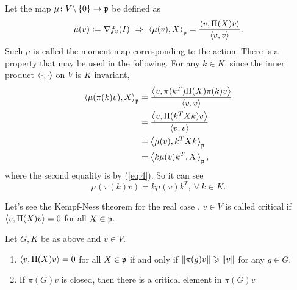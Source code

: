 \documentclass[suri,pdfbookmark]{engsuribt} %
\begin{document}
  Let the map $\mu \colon V\backslash \left\{0\right\} \rightarrow \mathfrak{p}$ be defined as
  \begin{equation*}
    \mu(v) \vcentcolon= \nabla f_v(I) ~\Rightarrow~ \left\langle \mu(v),X \right\rangle_{\mathfrak{p}} = \frac{\left\langle v,\Pi(X)v \right\rangle}{\left\langle v,v \right\rangle}.
  \end{equation*}
  Such $\mu$ is called the moment map corresponding to the action. There is a property that may be used in the following. For any $k \in K$, since the inner product $\left\langle \cdot,\cdot \right\rangle$ on $V$ is $K$-invariant,
  \begin{equation*}
    \begin{split}
      \left\langle \mu(\pi(k)v),X \right\rangle_{\mathfrak{p}} &= \frac{\left\langle v,\pi(k^T)\Pi(X)\pi(k)v \right\rangle}{\left\langle v,v \right\rangle} \\
      &= \frac{\left\langle v,\Pi(k^TXk)v \right\rangle}{\left\langle v,v \right\rangle} \\
      &= \left\langle \mu(v),k^TXk \right\rangle_{\mathfrak{p}} \\
      &= \left\langle k\mu(v)k^T,X \right\rangle_{\mathfrak{p}},
    \end{split}
  \end{equation*}
  where the second equality is by (\ref{eq:4}). So it can see
  \begin{equation}\label{eq:5}
    \mu(\pi(k)v) = k\mu(v)k^T,~\forall~k \in K.
  \end{equation}

  Let's see the Kempf-Ness theorem for the real case \cite[Theorem 2.23]{key5}. $v \in V$ is called critical if $\left\langle v, \Pi(X)v \right\rangle = 0$ for all $X \in \mathfrak{p}$.
  \begin{thm}
    Let $G,K$ be as above and $v \in V$.
    \begin{enumerate}[label = (\arabic*)]
      \item $\left\langle v, \Pi(X)v \right\rangle = 0$ for all $X \in \mathfrak{p}$ if and only if $\left\lVert\pi(g)v\right\lVert \geqslant \left\lVert v\right\lVert$ for any $g \in G$.
      \item If $\pi(G)v$ is closed, then there is a critical element in $\pi(G)v$ 
    \end{enumerate}
  \end{thm}
\end{document}
